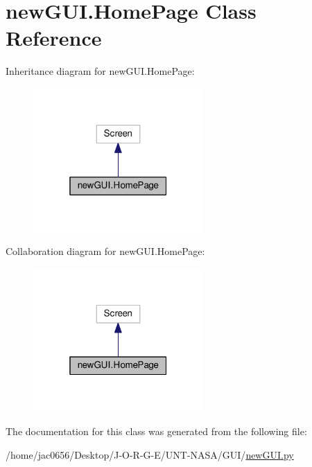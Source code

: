 \hypertarget{classnewGUI_1_1HomePage}{}\section{new\+G\+U\+I.\+Home\+Page Class Reference}
\label{classnewGUI_1_1HomePage}


Inheritance diagram for new\+G\+U\+I.\+Home\+Page\+:
\nopagebreak
\begin{figure}[H]
\begin{center}
\leavevmode
\includegraphics[width=184pt]{classnewGUI_1_1HomePage__inherit__graph}
\end{center}
\end{figure}


Collaboration diagram for new\+G\+U\+I.\+Home\+Page\+:
\nopagebreak
\begin{figure}[H]
\begin{center}
\leavevmode
\includegraphics[width=184pt]{classnewGUI_1_1HomePage__coll__graph}
\end{center}
\end{figure}


The documentation for this class was generated from the following file\+:\begin{DoxyCompactItemize}
\item 
/home/jac0656/\+Desktop/\+J-\/\+O-\/\+R-\/\+G-\/\+E/\+U\+N\+T-\/\+N\+A\+S\+A/\+G\+U\+I/\hyperlink{newGUI_8py}{new\+G\+U\+I.\+py}\end{DoxyCompactItemize}
